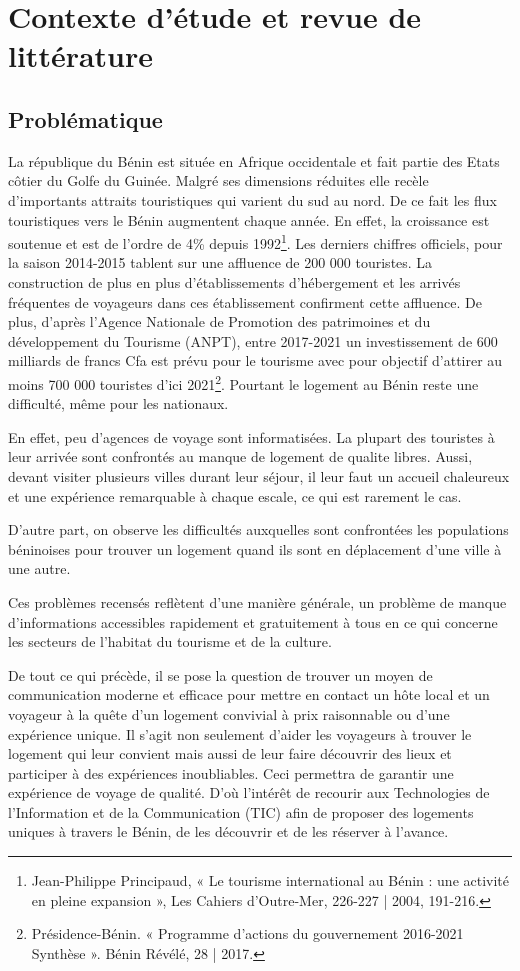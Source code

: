 \chapter{Contexte d'étude et revue de littérature}

\section{Problématique}
La république du Bénin est située en Afrique occidentale et fait partie des Etats côtier du Golfe du Guinée. Malgré ses dimensions réduites elle recèle d’importants attraits touristiques qui varient du sud au nord. De ce fait les flux touristiques vers le Bénin augmentent chaque année. En effet, la croissance est soutenue et est de l'ordre de 4\% depuis 1992\footnote{Jean-Philippe Principaud, « Le tourisme international au Bénin : une activité en pleine expansion », Les Cahiers d’Outre-Mer, 226-227 | 2004, 191-216.}. Les derniers chiffres officiels, pour la saison 2014-2015 tablent sur une affluence de 200 000 touristes. La construction de plus en plus d’établissements d’hébergement et les arrivés fréquentes de voyageurs dans ces établissement confirment cette affluence. De plus, d'après l’Agence Nationale de Promotion des patrimoines et du développement du Tourisme (ANPT), entre 2017-2021 un investissement de 600 milliards de francs Cfa est prévu pour le tourisme avec pour objectif d'attirer au moins 700 000 touristes d’ici 2021\footnote{Présidence-Bénin. « Programme d'actions du gouvernement 2016-2021 Synthèse ». Bénin Révélé, 28 | 2017.}. Pourtant le logement au Bénin reste une difficulté, même pour les nationaux.

En effet, peu d’agences de voyage sont informatisées. La plupart des touristes à leur arrivée sont confrontés au manque de logement de qualite libres. Aussi, devant visiter plusieurs villes durant leur séjour, il leur faut un accueil chaleureux et une expérience remarquable à chaque escale, ce qui est rarement le cas.

D'autre part, on observe les difficultés auxquelles sont confrontées les populations béninoises pour trouver un logement quand ils sont en déplacement d’une ville à une autre.

Ces problèmes recensés reflètent d’une manière générale, un problème de manque d’informations accessibles rapidement et gratuitement à tous en ce qui concerne les secteurs de l’habitat du tourisme et de la culture.

De tout ce qui précède, il se pose la question de trouver un moyen de communication moderne et efficace pour mettre en contact un hôte local et un voyageur à la quête d'un logement convivial à prix raisonnable ou d'une expérience unique. Il s’agit non seulement  d'aider les voyageurs à trouver le logement qui leur convient mais aussi de leur faire découvrir des lieux et participer à des expériences inoubliables. Ceci permettra de garantir une expérience de voyage de qualité. D’où l’intérêt de recourir aux Technologies de l’Information et de la Communication (TIC) afin de proposer des logements uniques à travers le Bénin, de les découvrir et de les réserver à l’avance.




